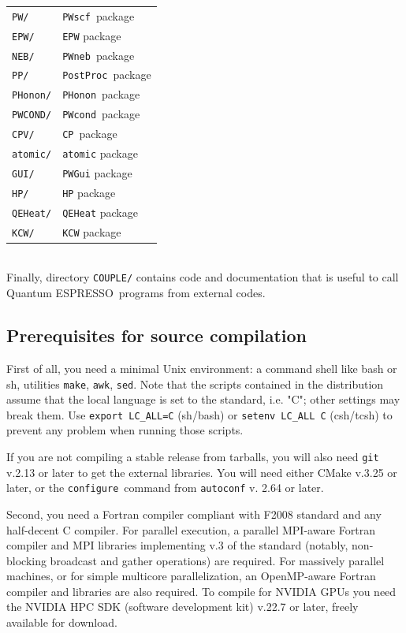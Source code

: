 \documentclass[12pt,a4paper]{article}
\def\qe{{\sc Quantum ESPRESSO}}
\def\configure{\texttt{configure}}
\def\PWscf{\texttt{PWscf}}
\def\PHonon{\texttt{PHonon}}
\def\CP{\texttt{CP}}
\def\PostProc{\texttt{PostProc}}
\def\NEB{\texttt{PWneb}}
\def\make{\texttt{make}}
\begin{document}
\begin{tabular}{ll}
\texttt{PW/}      & \PWscf\ package\\
\texttt{EPW/}     & \texttt{EPW} package\\
\texttt{NEB/}     & \NEB\ package\\
\texttt{PP/}      & \PostProc\ package\\
\texttt{PHonon/}  & \PHonon\ package\\
\texttt{PWCOND/}  & \texttt{PWcond}\ package\\
\texttt{CPV/}     & \CP\ package\\
\texttt{atomic/}  & \texttt{atomic} package\\
\texttt{GUI/}     & \texttt{PWGui} package\\
\texttt{HP/}      & \texttt{HP} package\\
\texttt{QEHeat/}  & \texttt{QEHeat} package\\
\texttt{KCW/}     & \texttt{KCW} package
\end{tabular}
\\

Finally, directory \texttt{COUPLE/} contains code and documentation
that is useful to call \qe\ programs from external codes.

\subsection{Prerequisites for source compilation}
\label{Sec:Installation}

First of all, you need a minimal Unix environment: a command shell 
like bash or sh, utilities \make, \texttt{awk}, \texttt{sed}. 
Note that the scripts contained in the distribution 
assume that the local  language is set to the standard, i.e. "C"; 
other settings may break them. Use \texttt{export LC\_ALL=C} (sh/bash) 
or \texttt{setenv LC\_ALL C} (csh/tcsh) to prevent any problem
when running those scripts.

If you are not compiling a stable release from tarballs,
you will also need \texttt{git} v.2.13 or later to get the 
external libraries.
You will need either CMake v.3.25 or later, or the \configure\ 
command from \texttt{autoconf} v. 2.64 or later.

Second, you need a Fortran compiler compliant with F2008 standard
and any half-decent C compiler.
For parallel execution, a parallel MPI-aware Fortran compiler 
and MPI libraries implementing v.3 of the standard (notably, 
non-blocking broadcast and gather operations) are required.
For massively parallel machines, or for simple multicore parallelization, 
an OpenMP-aware Fortran compiler and libraries are also required. 
To compile 
for NVIDIA GPUs you need the NVIDIA HPC SDK (software development kit)
v.22.7 or later, freely available for download.
\end{document}
